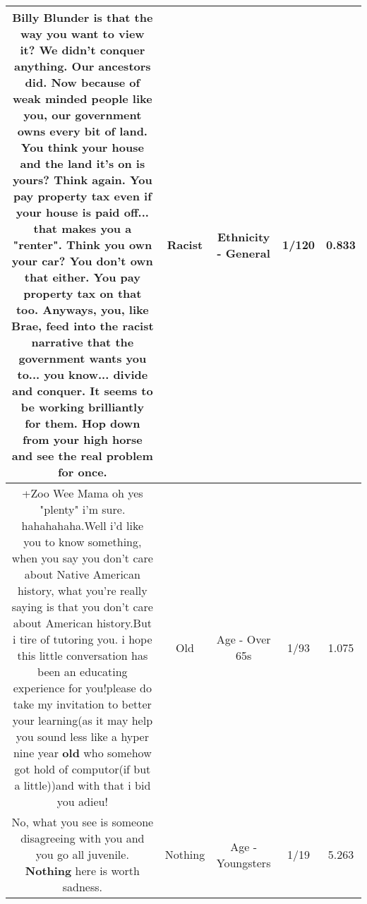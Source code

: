 \documentclass[11pt]{article}
\newlength\mylength
\begin{document}
\begin{center}
\begin{longtable}{|C{.65\mylength}|C{.30\mylength}|C{.12\mylength}|C{.12\mylength}|C{.12\mylength}|}
  \small Billy Blunder is that the way you want to view it? We didn't conquer anything. Our ancestors did. Now because of weak minded people like you, our government owns every bit of land. You think your house and the land it's on is yours? Think again. You pay property tax even if your house is paid off... that makes you a "renter". Think you own your car? You don't own that either. You pay property tax on that too. Anyways, you, like Brae, feed into the \textbf{racist} narrative that the government wants you to... you know... divide and conquer. It seems to be working brilliantly for them. Hop down from your high horse and see the real problem for once.\normalsize   & Racist & Ethnicity - General & 1/120 & 0.833 \\  \hline
  \small +Zoo Wee Mama oh yes "plenty" i'm sure. hahahahaha.Well i'd like you to know something, when you say you don't care about Native American history, what you're really saying is that you don't care about American history.But i tire of tutoring you. i hope this little conversation has been an educating experience for you!please do take my invitation to better your learning(as it may help you sound less like a hyper nine year \textbf{old} who somehow got hold of computor(if but a little))and with that i bid you adieu!\normalsize   & Old & Age - Over 65s & 1/93 & 1.075 \\  \hline
  \small No, what you see is someone disagreeing with you and you go all juvenile.  \textbf{Nothing} here is worth sadness.\normalsize   & Nothing & Age - Youngsters & 1/19 & 5.263 \\  \hline

\end{longtable}
\end{center}
\end{document}
